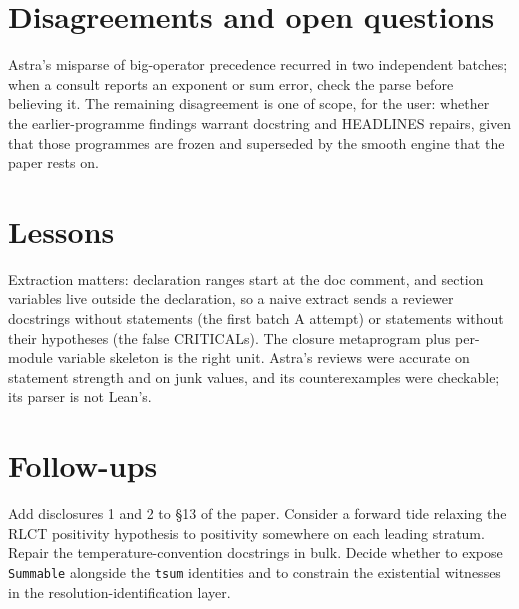 \documentclass[11pt]{article}
\begin{document}
\section{Disagreements and open questions}

Astra's misparse of big-operator precedence recurred in two independent batches; when a consult reports an exponent or sum error, check the parse before believing it. The remaining disagreement is one of scope, for the user: whether the earlier-programme findings warrant docstring and HEADLINES repairs, given that those programmes are frozen and superseded by the smooth engine that the paper rests on.

\section{Lessons}

Extraction matters: declaration ranges start at the doc comment, and section variables live outside the declaration, so a naive extract sends a reviewer docstrings without statements (the first batch A attempt) or statements without their hypotheses (the false CRITICALs). The closure metaprogram plus per-module variable skeleton is the right unit. Astra's reviews were accurate on statement strength and on junk values, and its counterexamples were checkable; its parser is not Lean's.

\section{Follow-ups}

Add disclosures 1 and 2 to \S13 of the paper. Consider a forward tide relaxing the RLCT positivity hypothesis to positivity somewhere on each leading stratum. Repair the temperature-convention docstrings in bulk. Decide whether to expose \texttt{Summable} alongside the \texttt{tsum} identities and to constrain the existential witnesses in the resolution-identification layer.
\end{document}
